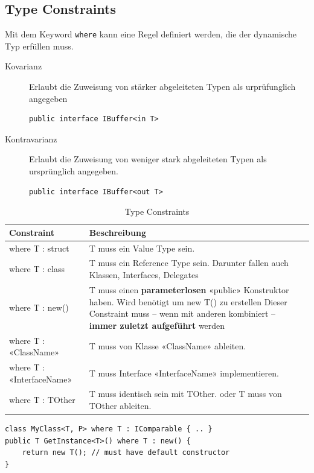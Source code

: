 \subsection{Type Constraints}
Mit dem Keyword \lstinline|where| kann eine Regel definiert werden, die der dynamische Typ erfüllen muss.

\begin{description}
	\item[Kovarianz] Erlaubt die Zuweisung von stärker abgeleiteten Typen als urprüfunglich angegeben
\begin{lstlisting}
public interface IBuffer<in T>
\end{lstlisting}
	\item[Kontravarianz] Erlaubt die Zuweisung von weniger stark abgeleiteten Typen als ursprünglich angegeben.
\begin{lstlisting}
public interface IBuffer<out T>
\end{lstlisting}
\end{description}

\begin{table}[h]
	\centering
	\begin{tabu} to \linewidth {l X}
		\toprule 
		Constraint & Beschreibung \\
		\midrule
		where T : struct & T muss ein Value Type sein. \\
		where T : class & T muss ein Reference Type sein. Darunter fallen auch Klassen, Interfaces, Delegates \\
		where T : new() & T muss einen \textbf{parameterlosen} «public» Konstruktor haben. Wird benötigt um new T() zu erstellen
		Dieser Constraint muss – wenn mit anderen kombiniert – \textbf{immer zuletzt 
		aufgeführt} werden  \\
		where T : «ClassName» & T muss von Klasse «ClassName» ableiten. \\
		where T : «InterfaceName» & T muss Interface «InterfaceName» implementieren. \\
		where T : TOther & T muss identisch sein mit TOther.
		oder
		T muss von TOther ableiten.  \\
		\bottomrule
	\end{tabu} 
	\caption{Type Constraints}
\end{table}
\begin{lstlisting}
class MyClass<T, P> where T : IComparable { .. }
public T GetInstance<T>() where T : new() {
	return new T(); // must have default constructor
}
\end{lstlisting}

